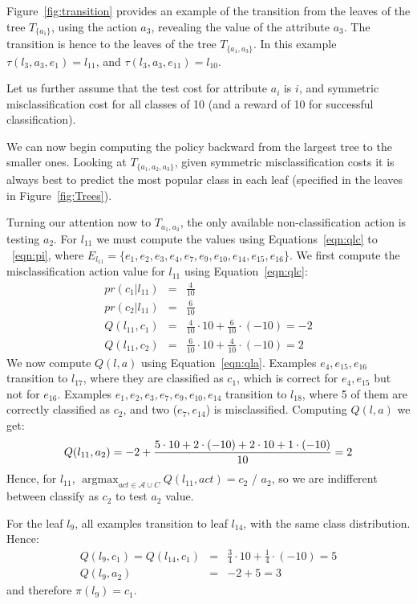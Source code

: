 \documentclass[letterpaper]{article}
\DeclareMathOperator*{\argmax}{argmax}
\theoremstyle{definition}
\begin{document}
Figure~\ref{fig:transition} provides an example of the transition from the leaves of the tree $T_{\{a_1\}}$, using the action $a_3$, revealing the value of the attribute $a_3$. The transition is hence to the leaves of the tree $T_{\{a_1,a_3\}}$. In this example $\tau(l_3,a_3,e_1)=l_{11}$, and $\tau(l_3,a_3,e_{11})=l_{10}$.



Let us further assume that the test cost for attribute $a_i$ is $i$, and symmetric misclassification cost for all classes of 10 (and a reward of 10 for successful classification).

We can now begin computing the policy backward from the largest tree to the smaller ones. Looking at $T_{\{a_1,a_2,a_3\}}$, given symmetric misclassification costs it is always best to predict the most popular class in each leaf (specified in the leaves in Figure~\ref{fig:Trees}).

Turning our attention now to $T_{a_1,a_3}$, the only available non-classification action is testing $a_2$. For $l_{11}$ we must compute the values using Equations~\ref{eqn:qlc} to ~\ref{eqn:pi}, where $E_{l_{11}} = \{e_1,e_2,e_3,e_4,e_7,e_9,e_{10},e_{14},e_{15},e_{16} \}$. We first compute the misclassification action value for $l_{11}$ using Equation~\ref{eqn:qlc}:
{\small
\begin{eqnarray}
pr(c_1|l_{11}) &=& \frac{4}{10} \\
pr(c_2|l_{11}) &=& \frac{6}{10} \\
Q(l_{11},c_1) &=& \frac{4}{10} \cdot 10 + \frac{6}{10} \cdot (-10) = -2\\
Q(l_{11},c_2) &=& \frac{6}{10} \cdot 10 + \frac{4}{10} \cdot (-10) = 2
\end{eqnarray}
}%
We now compute $Q(l,a)$ using Equation~\ref{eqn:qla}. Examples $e_4,e_{15},e_{16}$ transition to $l_{17}$, where they are classified as $c_1$, which is correct for $e_4,e_{15}$ but not for $e_{16}$. Examples $e_1,e_2,e_3,e_7,e_9,e_{10},e_{14}$ transition to $l_{18}$, where 5 of them are correctly classified as $c_2$, and two ($e_{7},e_{14}$) is misclassified. Computing $Q(l,a)$ we get:
\begin{equation}
\small
Q(l_{11},a_2) = -2 + \frac{5 \cdot 10 + 2 \cdot (-10) + 2 \cdot 10 + 1 \cdot (-10)}{10} = 2
\end{equation}
Hence, for $l_{11}$, $\argmax_{act \in \mathcal{A} \cup C} Q(l_{11},act) = c_2$ / $a_2$, so we are indifferent between classify as $c_2$ to test $a_2$ value.

For the leaf $l_9$, all examples transition to leaf $l_{14}$, with the same class distribution. Hence:
{\small
\begin{align}
Q(l_{9},c_1) = Q(l_{14},c_1) &=& \frac{3}{4} \cdot 10 + \frac{1}{4} \cdot (-10) = 5\\
Q(l_9,a_2) &=& -2 + 5 = 3
\end{align}
}%
and therefore $\pi(l_9)=c_1$.
\end{document}
